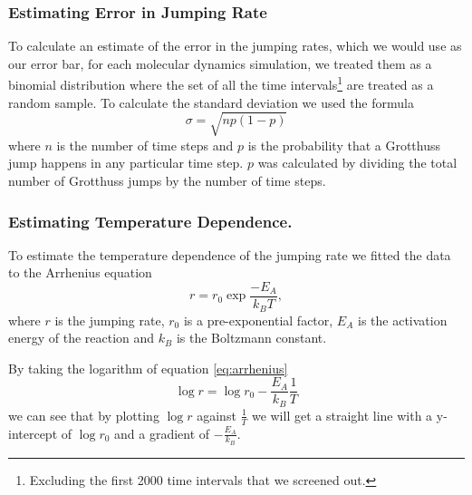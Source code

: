 \documentclass{article}
\begin{document}
\begin{multicols}{2}
\subsubsection{Estimating Error in Jumping Rate}
To calculate an estimate of the error in the jumping rates, which we would use as our error bar, for each molecular dynamics simulation, we treated them as a binomial distribution where the set of all the time intervals\footnote{Excluding the first 2000 time intervals that we screened out.} are treated as a random sample. To calculate the standard deviation we used the formula
\begin{equation}
	\sigma=\sqrt{np(1-p)}
\end{equation}
where $n$ is the number of time steps and $p$ is the probability that a Grotthuss jump happens in any particular time step. $p$ was calculated by dividing the total number of Grotthuss jumps by the number of time steps.

\subsubsection{Estimating Temperature Dependence.}

To estimate the temperature dependence of the jumping rate we fitted the data to the Arrhenius equation \cite{arrhenius1889dissociationswarme}
\begin{equation}
	\label{eq:arrhenius}
	r = r_{0}\exp{\frac{-E_{A}}{k_{B}T}},
\end{equation}
where $r$ is the jumping rate, $r_0$ is a pre-exponential factor, $E_{A}$ is the activation energy of the reaction and $k_{B}$ is the Boltzmann constant.\cite{planck1900theory}

By taking the logarithm of equation \ref{eq:arrhenius} 
\begin{equation}
	\label{eq:logr}
	\log{r}= \log{r_{0}} -\frac{E_{A}}{k_{B}}\frac{1}{T}
\end{equation}
we can see that by plotting $\log r$ against $\frac{1}{T}$ we will get a straight line with a y-intercept of $\log r_{0}$ and a gradient of $-\frac{E_{A}}{k_{B}}$.


\end{multicols}
\end{document}

